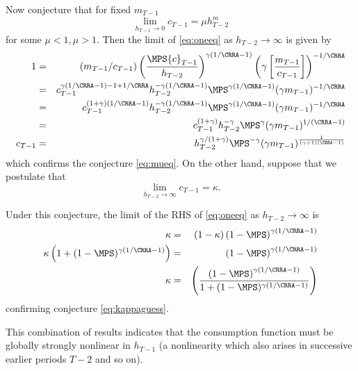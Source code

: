 \documentclass[titlepage]{\econtex}
\begin{document}
{  Now conjecture that for fixed ${m}_{T-1}$
  \begin{equation}
    \lim_{h_{T-1} \rightarrow 0} {c}_{T-1} = \mu h_{T-2}^{m}
    \label{eq:mueq}
  \end{equation}
  for some $\mu<1, \mu>1$.  Then the limit of \eqref{eq:oneeq} as $h_{T-2}
  \rightarrow \infty$ is given by
  \begin{eqnarray*}
    1 & = & ({m}_{T-1}/{c}_{T-1})\left(\frac{\MPS
            {c}_{T-1}}{h_{T-2}}\right)^{\gamma(1/\CRRA-1)}\left(\gamma
            \left[\frac{{m}_{T-1}}{{c}_{T-1}}\right]\right)^{-1/\CRRA}
    \\    & = &
                {c}_{T-1}^{\gamma(1/\CRRA-1)-1+1/\CRRA}h_{T-2}^{-\gamma(1/\CRRA-1)}\MPS^{\gamma(1/\CRRA-1)}(\gamma {m}_{T-1})^{-1/\CRRA}
    \\    & = &
                {c}_{T-1}^{(1+\gamma)(1/\CRRA-1)}h_{T-2}^{-\gamma(1/\CRRA-1)}\MPS^{\gamma(1/\CRRA-1)}(\gamma {m}_{T-1})^{-1/\CRRA}
    \\    & = &
                {c}_{T-1}^{(1+\gamma)}h_{T-2}^{-\gamma}\MPS^{\gamma}(\gamma {m}_{T-1})^{1/(\CRRA-1)}
    \\ {c}_{T-1}   & = & h_{T-2}^{\gamma/(1+\gamma)}\MPS^{-\gamma}(\gamma
                         {m}_{T-1})^{\frac{1}{(\gamma+1)(\CRRA-1)}}
  \end{eqnarray*}
  which confirms the conjecture \eqref{eq:mueq}.  On the other hand,
  suppose that we postulate that
  \begin{equation}
    \lim_{h_{T-2} \rightarrow \infty} {c}_{T-1} = \kappa.
    \label{eq:kappaguess}
  \end{equation}

  Under this conjecture, the limit of the RHS of \eqref{eq:oneeq} as
  $h_{T-2} \rightarrow \infty$ is
  \begin{eqnarray*}
    \kappa & = &
                 (1-\kappa)\left(1-\MPS\right)^{\gamma(1/\CRRA-1)}
    \\      \kappa\left(1+(1-\MPS)^{\gamma(1/\CRRA-1)}\right) & = & \left(1-\MPS\right)^{\gamma(1/\CRRA-1)}
    \\      \kappa & = &
                         \left(\frac{\left(1-\MPS\right)^{\gamma(1/\CRRA-1)}}
                         {1+(1-\MPS)^{\gamma(1/\CRRA-1)}}\right)
  \end{eqnarray*}
  confirming conjecture \eqref{eq:kappaguess}.

  This combination of results indicates that the consumption function
  must be globally strongly nonlinear in $h_{T-1}$ (a nonlinearity which
  also arises in successive earlier periods $T-2$ and so on).

}
\end{document}

